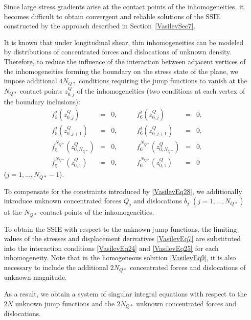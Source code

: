 Since large stress gradients arise at the contact points of the
inhomogeneities, it becomes difficult to obtain convergent and
reliable solutions of the SSIE constructed by the approach described
in Section~\ref{VasilevSec7}.

It is known that under longitudinal shear, thin inhomogeneities can be
modeled by distributions of concentrated forces and dislocations of
unknown density. Therefore, to reduce the influence of the interaction
between adjacent vertices of the inhomogeneities forming the boundary
on the stress state of the plane, we impose additional $4N_{Q*}$
conditions requiring the jump functions to vanish at the
$N_{Q*}$ contact points $z_{0,j}^{Q}$ of the inhomogeneities
(two conditions at each vertex of the boundary inclusions):
\begin{equation}
	\label{VasilevEq28}
	\begin{array}{rclrcl}
		f_{5}^{j}(z_{0,j}^{Q}) &=&0,
		\qquad &
		f_{6}^{j}(z_{0,j}^{Q}) &=&0,
		\\[4pt]
		f_{5}^{j}(z_{0,j+1}^{Q}) &=&0,
		\qquad &
		f_{6}^{j}(z_{0,j+1}^{Q}) &=&0,
		\\[4pt]
		f_{5}^{N_{Q*}}(z_{0,N_{Q*}}^{Q}) &=&0,
		\qquad &
		f_{6}^{N_{Q*}}(z_{0,N_{Q*}}^{Q}) &=&0,
		\\[4pt]
		f_{5}^{N_{Q*}}(z_{0,1}^{Q}) &=&0,
		\qquad &
		f_{6}^{N_{Q*}}(z_{0,1}^{Q}) &=&0
	\end{array}
\end{equation}
($j=1,\ldots,N_{Q*}-1$).

To compensate for the constraints introduced by
\eqref{VasilevEq28}, we additionally introduce unknown concentrated
forces $Q_j$ and dislocations $b_j$ $(j=1,\ldots,N_{Q*})$ at the
$N_{Q*}$ contact points of the inhomogeneities.

To obtain the SSIE with respect to the unknown jump functions, the
limiting values of the stresses and displacement derivatives
\eqref{VasilevEq7} are substituted into the interaction conditions
\eqref{VasilevEq24} and \eqref{VasilevEq25} for each inhomogeneity.
Note that in the homogeneous solution \eqref{VasilevEq9}, it is also
necessary to include the additional $2N_{Q*}$ concentrated forces and
dislocations of unknown magnitude.

As a result, we obtain a system of singular integral equations with
respect to the $2N$ unknown jump functions and the $2N_{Q*}$ unknown
concentrated forces and dislocations.

